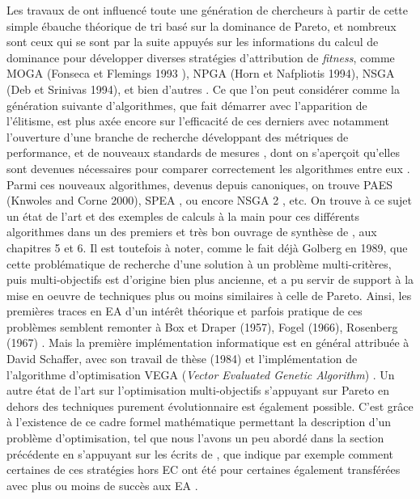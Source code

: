 Les travaux de \textcite{Goldberg1989} ont influencé toute une génération de chercheurs à partir de cette simple ébauche théorique de tri basé sur la dominance de Pareto, et nombreux sont ceux qui se sont par la suite appuyés \autocite[175, 235]{Deb2001} sur les informations du calcul de dominance pour développer diverses stratégies d'attribution de \textit{fitness}, comme MOGA (Fonseca et Flemings 1993 \autocite{Fonseca1993}), NPGA (Horn et Nafpliotis 1994), NSGA (Deb et Srinivas 1994), et bien d'autres \autocite[14]{Zitzler1999a}. Ce que l'on peut considérer comme la génération suivante d'algorithmes, que \textcite{Coello2006} fait démarrer avec l'apparition de l'élitisme, est plus axée encore sur l'efficacité de ces derniers avec notamment l'ouverture d'une branche de recherche développant des métriques de performance, et de nouveaux standards de mesures \autocites{Coello2006, Zitzler2003,Huband2006}, dont on s'aperçoit qu'elles sont devenues nécessaires pour comparer correctement les algorithmes entre eux \autocite[14-15]{Zitzler1999a}. Parmi ces nouveaux algorithmes, devenus depuis canoniques, on trouve PAES (Knwoles and Corne 2000), SPEA \autocite{Zitzler1999b}, ou encore NSGA 2 \autocite{Deb2000a}, etc. On trouve à ce sujet un état de l'art et des exemples de calculs à la main pour ces différents algorithmes dans un des premiers et très bon ouvrage de synthèse de \textcite{Deb2001}, aux chapitres 5 et 6. Il est toutefois à noter, comme le fait déjà Golberg en 1989, que cette problématique de recherche d'une solution à un problème multi-critères, puis multi-objectifs est d'origine bien plus ancienne, et a pu servir de support à la mise en oeuvre de techniques plus ou moins similaires à celle de Pareto. Ainsi, les premières traces en EA d'un intérêt théorique et parfois pratique de ces problèmes semblent remonter à Box et Draper (1957), Fogel (1966), Rosenberg (1967) \autocite[174-175]{Deb2001}. Mais la première implémentation informatique est en général attribuée à David Schaffer, avec son travail de thèse (1984) et l'implémentation de l'algorithme d'optimisation VEGA (\textit{Vector Evaluated Genetic Algorithm}) \autocite{Schaffer1985}. Un autre état de l'art sur l'optimisation multi-objectifs s'appuyant sur Pareto en dehors des techniques purement évolutionnaire est également possible. C'est grâce à l'existence de ce cadre formel mathématique permettant la description d'un problème d'optimisation, tel que nous l'avons un peu abordé dans la section précédente en s'appuyant sur les écrits de \autocite{Weise2011}, que \textcite[50-79]{Deb2001} indique par exemple comment certaines de ces stratégies hors EC ont été pour certaines également transférées avec plus ou moins de succès aux EA \textcite[171-237]{Deb2001}.

